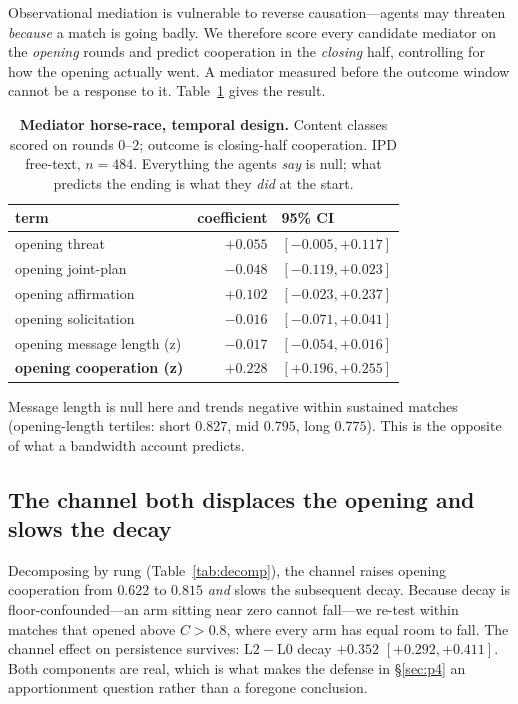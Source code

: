 Observational mediation is vulnerable to reverse causation---agents may threaten
\emph{because} a match is going badly. We therefore score every candidate mediator on
the \emph{opening} rounds and predict cooperation in the \emph{closing} half,
controlling for how the opening actually went. A mediator measured before the outcome
window cannot be a response to it. Table~\ref{tab:horserace} gives the result.

\begin{table}[t]
\centering
\caption{\textbf{Mediator horse-race, temporal design.} Content classes scored on
rounds $0$--$2$; outcome is closing-half cooperation. IPD free-text, $n{=}484$.
Everything the agents \emph{say} is null; what predicts the ending is what they
\emph{did} at the start.}
\label{tab:horserace}
\small
\begin{tabularx}{0.8\textwidth}{X r l}
\toprule
term & coefficient & 95\% CI \\
\midrule
opening threat            & $+0.055$ & $[-0.005, +0.117]$ \\
opening joint-plan        & $-0.048$ & $[-0.119, +0.023]$ \\
opening affirmation       & $+0.102$ & $[-0.023, +0.237]$ \\
opening solicitation      & $-0.016$ & $[-0.071, +0.041]$ \\
opening message length (z)& $-0.017$ & $[-0.054, +0.016]$ \\
\textbf{opening cooperation (z)} & $\mathbf{+0.228}$ & $\mathbf{[+0.196, +0.255]}$ \\
\bottomrule
\end{tabularx}
\end{table}

Message length is null here and trends negative within sustained matches
(opening-length tertiles: short $0.827$, mid $0.795$, long $0.775$). This is the
opposite of what a bandwidth account predicts.

\subsection{The channel both displaces the opening and slows the decay}
\label{sec:decomp}

Decomposing by rung (Table~\ref{tab:decomp}), the channel raises opening cooperation
from $0.622$ to $0.815$ \emph{and} slows the subsequent decay. Because decay is
floor-confounded---an arm sitting near zero cannot fall---we re-test within matches
that opened above $C>0.8$, where every arm has equal room to fall. The channel effect
on persistence survives: $\mathrm{L2}-\mathrm{L0}$ decay $+0.352$ $[+0.292,+0.411]$.
Both components are real, which is what makes the defense in \S\ref{sec:p4} an
apportionment question rather than a foregone conclusion.

